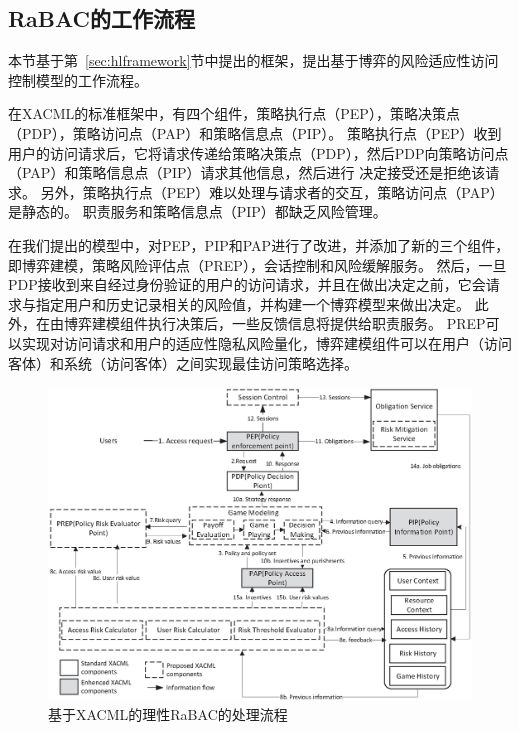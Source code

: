 \subsection{RaBAC的工作流程}


本节基于第~\ref{sec:hlframework}节中提出的框架，提出基于博弈的风险适应性访问控制模型的工作流程。

在XACML的标准框架中，有四个组件，策略执行点（PEP），策略决策点（PDP），策略访问点（PAP）和策略信息点（PIP）。 策略执行点（PEP）收到用户的访问请求后，它将请求传递给策略决策点（PDP），然后PDP向策略访问点（PAP）和策略信息点（PIP）请求其他信息，然后进行 决定接受还是拒绝该请求。 另外，策略执行点（PEP）难以处理与请求者的交互，策略访问点（PAP）是静态的。 职责服务和策略信息点（PIP）都缺乏风险管理。


在我们提出的模型中，对PEP，PIP和PAP进行了改进，并添加了新的三个组件，即博弈建模，策略风险评估点（PREP），会话控制和风险缓解服务。 然后，一旦PDP接收到来自经过身份验证的用户的访问请求，并且在做出决定之前，它会请求与指定用户和历史记录相关的风险值，并构建一个博弈模型来做出决定。 此外，在由博弈建模组件执行决策后，一些反馈信息将提供给职责服务。 PREP可以实现对访问请求和用户的适应性隐私风险量化，博弈建模组件可以在用户（访问客体）和系统（访问客体）之间实现最佳访问策略选择。

\begin{figure}[htb]
	\centering
	\includegraphics[width=1\textwidth]{./figures/game-rbac-workflow.eps}
	\caption{基于XACML的理性RaBAC的处理流程}\label{fig:game-rbac-workflow}
\end{figure}



